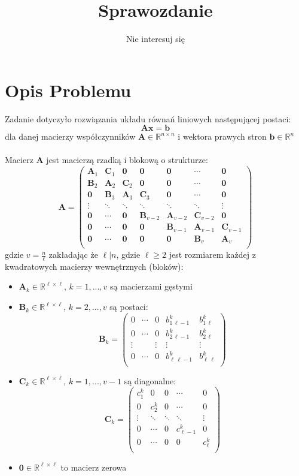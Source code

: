 \documentclass{article}
\author{Nie interesuj się}
\title{\vspace{-2.0cm}Sprawozdanie}
\newcommand{\mA}{\bm{A}}
\newcommand{\mB}{\bm{B}}
\newcommand{\mC}{\bm{C}}
\newcommand{\mZ}{\bm{0}}
\newcommand{\vb}{\bm{b}}
\newcommand{\vx}{\bm{x}}
\begin{document}
\maketitle
\section*{Opis Problemu}
 \noindent Zadanie dotyczyło rozwiązania układu równań liniowych następującej postaci:
$$\mA\vx  = \vb$$
dla danej macierzy współczynników $\textbf{A} \in \mathbb{R}^{n \times n}$ i wektora prawych stron $\textbf{b} \in \mathbb{R}^{n}$\\\\
\noindent Macierz \textbf{A} jest macierzą rzadką i blokową o strukturze:
$$
\mA =
\left(\begin{array}{ccccccc}
\mA_1 & \mC_1 & \mZ & \mZ & \mZ & \cdots & \mZ \\
\mB_2 & \mA_2 & \mC_2 & \mZ & \mZ  & \cdots & \mZ \\
\mZ  & \mB_3 & \mA_3 & \mC_3 & \mZ  & \cdots & \mZ \\
\vdots & \ddots & \ddots & \ddots & \ddots & \ddots & \vdots\\
\mZ   & \cdots & \mZ  & \mB_{v-2} & \mA_{v-2} & \mC_{v-2} & \mZ \\
\mZ  & \cdots & \mZ  &  \mZ &\mB_{v-1} & \mA_{v-1} & \mC_{v-1}  \\
\mZ  & \cdots & \mZ & \mZ & \mZ& \mB_{v} & \mA_{v}  \\
\end{array}\right)
$$ 
gdzie $v=\frac{n}{\ell}$ zakładając że $\ell|n$, gdzie $\ell \geq 2$ jest rozmiarem każdej z kwadratowych macierzy wewnętrznych (bloków):
\begin{itemize}
	\item $\mA_k \in \mathbb{R}^{\ell \times \ell}$, $k=1,...,v$ są macierzami gęstymi
	\item $\mB_k \in \mathbb{R}^{\ell \times \ell}$, $k=2,...,v$ są postaci:
	$$
	\mB_k =
	\left(\begin{array}{ccccc}
	0 & \cdots & 0 & b_{1\,\ell-1}^k & b_{1\,\ell}^k \\
	0 & \cdots & 0 & b_{2\,\ell-1}^k & b_{2\,\ell}^k \\
	\vdots & & \vdots & \vdots & \vdots \\
	0 & \cdots & 0 & b_{\ell\,\ell-1}^k & b_{\ell\,\ell}^k \\
	\end{array}\right)
	$$ 
	\item $\mC_k \in \mathbb{R}^{\ell \times \ell}$, $k=1,...,v-1$ są diagonalne:
	$$
	\mC_k =
	\left(\begin{array}{ccccc}
	c_{1}^k & 0 & 0 & \cdots & 0  \\
	0 &  c_{2}^k &  0 & \cdots & 0  \\
	\vdots &  \ddots &  \ddots & \ddots & \vdots  \\
	0 & \cdots & 0 &  c_{\ell-1}^k & 0 \\
	0 & \cdots & 0 &  0 & c_{\ell}^k \\
	\end{array}\right)
	$$
	\item $\mZ \in \mathbb{R}^{\ell \times \ell}$ to macierz zerowa
\end{itemize}
\end{document}
